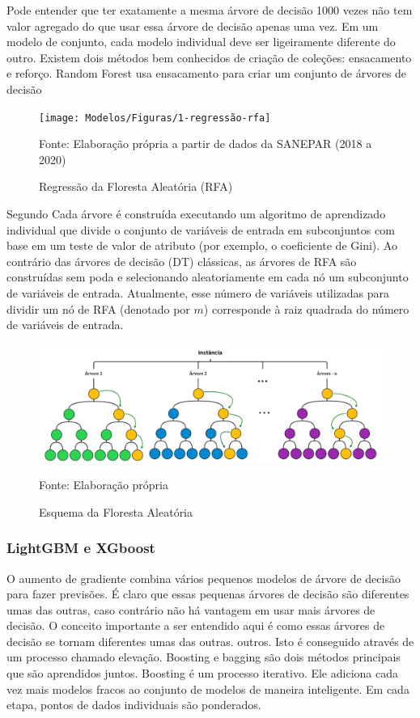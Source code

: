 Pode entender que ter exatamente a mesma árvore de decisão 1000 vezes não tem valor agregado do que usar essa árvore de decisão apenas uma vez.  Em um modelo de conjunto, cada modelo individual deve ser ligeiramente diferente do outro. Existem dois métodos bem conhecidos de criação de coleções: ensacamento e reforço.  Random Forest usa ensacamento para criar um conjunto de árvores de decisão

\begin{figure}[H]
	\centering
	\caption{Regressão da Floresta Aleatória (RFA)}
	\label{fig:1-regressao-rfa}
	\texttt{[image: Modelos/Figuras/1-regressão-rfa]}
	
	Fonte: Elaboração própria a partir de dados da SANEPAR (2018 a 2020)
\end{figure}

Segundo  Cada árvore é construída executando um algoritmo de aprendizado individual que divide o conjunto de variáveis de entrada em subconjuntos com base em um teste de valor de atributo (por exemplo, o coeficiente de Gini). Ao contrário das árvores de decisão (DT) clássicas, as árvores de RFA são construídas sem poda e selecionando aleatoriamente em cada nó um subconjunto de variáveis de entrada. Atualmente, esse número de variáveis utilizadas para dividir um nó de RFA (denotado por $m$) corresponde à raiz quadrada do número de variáveis de entrada.

\begin{figure}[H]
	\centering
	\caption{Esquema da Floresta Aleatória}
	\label{fig:rf}
	\includegraphics[width=1\linewidth]{Modelos/Figuras/RF}
	
	Fonte: Elaboração própria
\end{figure}


\subsubsection{LightGBM e XGboost}\label{subsubsec:lgbxgb}

O aumento de gradiente combina vários pequenos modelos de árvore de decisão para fazer previsões. É claro que essas pequenas árvores de decisão são diferentes umas das outras, caso contrário não há vantagem em usar mais árvores de decisão. O conceito importante a ser entendido aqui é como essas árvores de decisão se tornam diferentes umas das outras. outros. Isto é conseguido através de um processo chamado elevação. Boosting e bagging são dois métodos principais que são aprendidos juntos.  Boosting é um processo iterativo. Ele adiciona cada vez mais modelos fracos ao conjunto de modelos de maneira inteligente. Em cada etapa, pontos de dados individuais são ponderados.  

